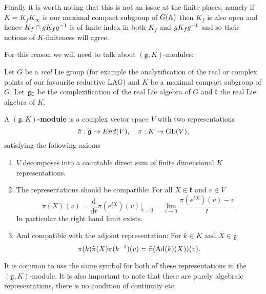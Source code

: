 \begin{example}
    Finally it is worth noting that this is not an issue at the finite places, namely if \(K = K_fK_\infty\) is our maximal compact subgroup of \(G(\A)\) then \(K_f\) is also open and hence \(K_f \cap gK_f g^{-1}\) is of finite index in both \(K_f\) and \(gK_f g^{-1}\) and so their notions of \(K\)-finiteness will agree. 
\end{example}

For this reason we will need to talk about \((\mathfrak{g}, K)\)-modules:

\begin{definition}
    Let \(G\) be a \textit{real} Lie group (for example the analytification of the real or complex points of our favourite reductive LAG) and \(K\) be a maximal compact subgroup of \(G\). Let \(\mathfrak{g}_\C\) be the complexification of the real Lie algebra of \(G\) and \(\mathfrak{k}\) the real Lie algebra of \(K\). 
    
    A \textbf{\((\mathfrak{g}, K)\)-module} is a complex vector space \(V\) with two representations 
    \[\tilde{\pi}: \mathfrak{g} \to End(V), \quad \pi: K\to \operatorname{GL}(V),\]
    satisfying the following axioms
    \begin{enumerate}
        \item \(V\) decomposes into a countable direct sum of finite dimensional \(K\) representations.
        \item The representations should be compatible: For all \(X \in \mathfrak{k}\) and \(v\in V\)
        \[\tilde{\pi}(X)(v) = \frac{\mathrm{d}}{\mathrm{d}t}\pi(e^{tX})(v)|_{t=0} = \lim_{t\to 0}\frac{\pi(e^{tX})(v) - v}{t}.\]
        In particular the right hand limit exists.
        \item And compatible with the adjoint representation: For \(k\in K\) and \(X\in \mathfrak{g}\) 
         \[\pi(k)\tilde{\pi}(X) \pi(k^{-1} )(v) = \tilde{\pi}(\mathrm{Ad}(k)(X))(v).\]
    \end{enumerate}
\end{definition}

\begin{remark}
    It is common to use the same symbol for both of these representations in the \((\mathfrak{g}, K)\)-module. It is also important to note that these are purely algebraic representations, there is no condition of continuity etc. 
\end{remark}

